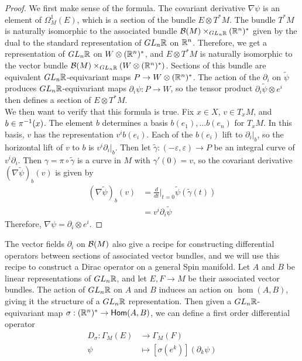 %
\begin{proof}
We first make sense of the formula. The covariant derivative $\nabla\psi$ is
an element of $\Omega_M^1(E)$, which is a section of the bundle $E \otimes T^*M$.
The bundle $T^*M$ is naturally isomorphic to the associated bundle
$\mathcal{B}(M) \times_{GL_n\mathbb{R}} (\mathbb{R}^n)^*$ given by the dual to the standard representation
of $GL_n\mathbb{R}$ on $\mathbb{R}^n$. Therefore, we get a representation of $GL_n\mathbb{R}$ on
$W \otimes (\mathbb{R}^n)^*$, and $E \otimes T^*M$ is naturally isomorphic to the vector
bundle $\mathcal{B}(M) \times_{GL_n\mathbb{R}} (W \otimes (\mathbb{R}^n)^*)$. Sections of this bundle
are equivalent $GL_n\mathbb{R}$-equivariant maps $P \to W \otimes (\mathbb{R}^n)^*$. The action
of the $\partial_i$ on $\tilde{\psi}$ produces $GL_n\mathbb{R}$-equivariant maps
$\partial_i\psi : P \to W$, so the tensor product
$\partial_i\tilde{\psi} \otimes e^i$ then defines a section of $E \otimes T^*M$. \\

We then want to verify that this formula is true. Fix $x \in X$, $v \in T_xM$,
and $b \in \pi^{-1}(x)$. The element $b$ determines a basis $b(e_1), \ldots b(e_n)$
for $T_xM$. In this basis, $v$ has the representation $v^ib(e_i)$. Each
of the $b(e_i)$ lift to $\partial_i\vert_b$, so the horizontal lift of $v$ to $b$
is $v^i\partial_i\vert_b$. Then let
$\tilde{\gamma} : (-\varepsilon, \varepsilon) \to P$ be an integral curve of
$v^i\partial_i$. Then $\gamma = \pi \circ \tilde{\gamma}$ is a curve in $M$
with $\gamma'(0) = v$, so the covariant derivative $(\nabla\tilde{\psi})_b(v)$ is
given by
\begin{align*}
(\nabla\tilde{\psi})_b(v) &= \frac{d}{dt}\bigg\vert_{t=0}
\tilde{\psi}(\tilde{\gamma}(t)) \\
&= v^i\partial_i\tilde{\psi}
\end{align*}
Therefore, $\nabla\psi = \partial_i \otimes e^i$.
\end{proof}
%
The vector fields $\partial_i$ on $\mathcal{B}(M)$ also give a recipe for constructing
differential operators between sections of associated vector bundles,
and we will use this recipe to construct a Dirac operator on a general Spin
manifold. Let $A$ and $B$ be linear representations of $GL_n\mathbb{R}$, and let
$E,F \to M$ be their associated vector bundles. The action of $GL_n\mathbb{R}$ on
$A$ and $B$ induces an action on $\hom(A,B)$, giving it the structure
of a $GL_n\mathbb{R}$ representation. Then given a $GL_n\mathbb{R}$-equivariant map
$\sigma : (\mathbb{R}^n)^* \to \mathsf{Hom}(A,B)$, we can define a first order differential
operator
\begin{align*}
D_\sigma : \Gamma_M(E) &\to \Gamma_M(F) \\
\psi &\mapsto [\sigma(e^k)](\partial_k\psi)
\end{align*}
